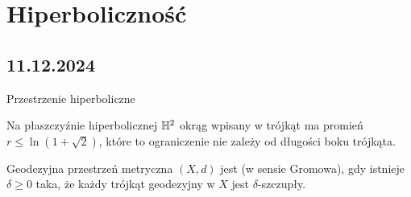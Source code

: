 \chapter{Hiperboliczność}

\section{11.12.2024}{Przestrzenie hiperboliczne}

Na płaszczyźnie hiperbolicznej $\mathbb{H}^2$ okrąg wpisany w trójkąt ma promień $r\leq\ln(1+\sqrt{2})$, które to ograniczenie nie zależy od długości boku trójkąta.

\begin{center}
\end{center}

\begin{definition}{}{}
  Geodezyjna przestrzeń metryczna $(X, d)$ jest  (w sensie Gromowa), gdy istnieje $\delta\geq 0$ taka, że każdy trójkąt geodezyjny w $X$ jest $\delta$-szczupły.
\end{definition}

